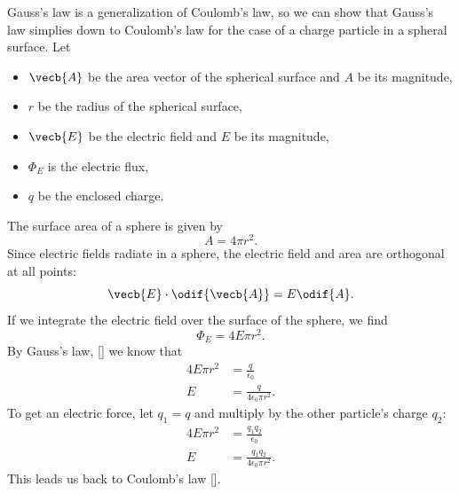 Gauss's law is a generalization of Coulomb's law,
so we can show that Gauss's law simplies down to Coulomb's law
for the case of a charge particle in a spheral surface.
Let
\begin{itemize}
    \item \(\vecb{A}\) be the area vector of the spherical surface
        and \(A\) be its magnitude,
    \item \(r\) be the radius of the spherical surface,
    \item \(\vecb{E}\) be the electric field and \(E\) be its magnitude,
    \item \(\Phi_E\) is the electric flux,
    \item \(q\) be the enclosed charge.
\end{itemize}
The surface area of a sphere is given by
\begin{equation}
    A = 4 \pi r^2.
\end{equation}
Since electric fields radiate in a sphere,
the electric field and area are orthogonal at all points:
\begin{equation}
    \vecb{E} \cdot \odif{\vecb{A}} = E \odif{A}.
\end{equation}
If we integrate the electric field over the surface of the sphere, we find
\begin{equation}
    \Phi_E = 4 E \pi r^2.
\end{equation}
By Gauss's law, [] we know that
\begin{equation}
    \begin{aligned}
        4 E \pi r^2 &= \frac{q}{\epsilon_0} \\
        E &= \frac{q}{4 \epsilon_0 \pi r^2}.
    \end{aligned}
\end{equation}
To get an electric force,
let \(q_1 = q\) and multiply by the other particle's charge \(q_2\):
\begin{equation*}
    \begin{aligned}
        4 E \pi r^2 &= \frac{q_1 q_2}{\epsilon_0} \\
        E &= \frac{q_1 q_2}{4 \epsilon_0 \pi r^2}.
    \end{aligned}
\end{equation*}
This leads us back to Coulomb's law [].

